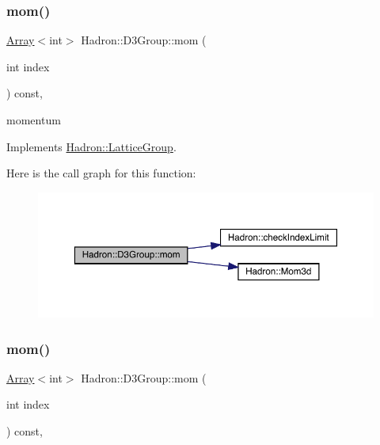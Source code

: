 \subsubsection{\texorpdfstring{mom()}{mom()}\hspace{0.1cm}{\footnotesize\ttfamily [1/3]}}
{\footnotesize\ttfamily \mbox{\hyperlink{classXMLArray_1_1Array}{Array}}$<$int$>$ Hadron\+::\+D3\+Group\+::mom (\begin{DoxyParamCaption}\item[{int}]{index }\end{DoxyParamCaption}) const\hspace{0.3cm}{\ttfamily [inline]}, {\ttfamily [virtual]}}

momentum 

Implements \mbox{\hyperlink{structHadron_1_1LatticeGroup_ad577b65041dd9a6e84b1f3bd49cb8fce}{Hadron\+::\+Lattice\+Group}}.

Here is the call graph for this function\+:
\nopagebreak
\begin{figure}[H]
\begin{center}
\leavevmode
\includegraphics[width=350pt]{de/de1/structHadron_1_1D3Group_a5662028a7fb3554c893609148e6d3eeb_cgraph}
\end{center}
\end{figure}
\mbox{\label{structHadron_1_1D3Group_a5662028a7fb3554c893609148e6d3eeb}} 
\subsubsection{\texorpdfstring{mom()}{mom()}\hspace{0.1cm}{\footnotesize\ttfamily [2/3]}}
{\footnotesize\ttfamily \mbox{\hyperlink{classXMLArray_1_1Array}{Array}}$<$int$>$ Hadron\+::\+D3\+Group\+::mom (\begin{DoxyParamCaption}\item[{int}]{index }\end{DoxyParamCaption}) const\hspace{0.3cm}{\ttfamily [inline]}, {\ttfamily [virtual]}}

